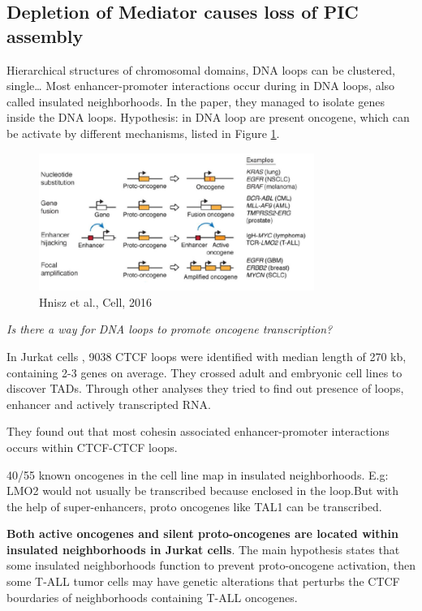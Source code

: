 \subsection{Depletion of Mediator causes loss of PIC assembly}

Hierarchical structures of chromosomal domains, DNA loops can be clustered, single\ldots{}
Most enhancer-promoter interactions occur during in DNA loops, also called insulated neighborhoods. In the paper, they managed to isolate genes inside the DNA loops.
Hypothesis: in DNA loop are present oncogene, which can be activate by different mechanisms, listed in Figure \ref{fig:proto}.

\begin{figure}
\centering
\includegraphics[width=0.8\textwidth]{../_resources/4eb79fba5a169cc3d31f5400dee44c80.png}
\caption{Hnisz et al., Cell, 2016}
\label{fig:proto}
\end{figure}

\emph{Is there a way for DNA loops to promote oncogene transcription?}

In Jurkat cells , 9038 CTCF loops were identified with median length of 270 kb, containing 2-3 genes on average. They crossed adult and embryonic cell lines to discover TADs. Through other analyses they tried to find out presence of loops, enhancer and actively transcripted RNA.

They found out that most cohesin associated enhancer-promoter interactions occurs within CTCF-CTCF loops.

40/55 known oncogenes in the cell line map in insulated neighborhoods. E.g: LMO2 would not usually be transcribed because enclosed in the loop.But with the help of super-enhancers, proto oncogenes like TAL1 can be transcribed.

\textbf{Both active oncogenes and silent proto-oncogenes are located within insulated neighborhoods in Jurkat cells}. 
The main hypothesis states that some insulated neighborhoods function to prevent proto-oncogene activation, then some T-ALL tumor cells may have genetic alterations that perturbs the CTCF bourdaries of neighborhoods containing T-ALL oncogenes.

